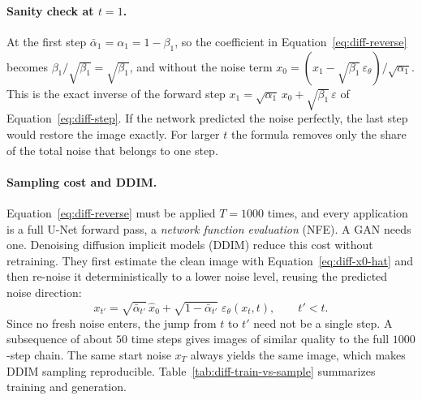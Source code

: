 \paragraph{Sanity check at $t=1$.}
At the first step $\bar\alpha_1=\alpha_1=1-\beta_1$, so the coefficient in
Equation~\ref{eq:diff-reverse} becomes
$\beta_1/\sqrt{\beta_1}=\sqrt{\beta_1}$, and without the noise term
$x_0=(x_1-\sqrt{\beta_1}\,\varepsilon_\theta)/\sqrt{\alpha_1}$. This is the
exact inverse of the forward step $x_1=\sqrt{\alpha_1}\,x_0+\sqrt{\beta_1}\,
\varepsilon$ of Equation~\ref{eq:diff-step}. If the network predicted the
noise perfectly, the last step would restore the image exactly. For larger
$t$ the formula removes only the share of the total noise that belongs to one
step.

\paragraph{Sampling cost and DDIM.}
Equation~\ref{eq:diff-reverse} must be applied $T=1000$ times, and every
application is a full U-Net forward pass, a \emph{network function
evaluation} (NFE). A GAN needs one. Denoising diffusion implicit models
(DDIM) reduce this cost without retraining. They first estimate the clean
image with Equation~\ref{eq:diff-x0-hat} and then re-noise it
deterministically to a lower noise level, reusing the predicted noise
direction:
\begin{equation}
  x_{t'} = \sqrt{\bar\alpha_{t'}}\,\hat x_0
  + \sqrt{1-\bar\alpha_{t'}}\;\varepsilon_\theta(x_t,t),
  \qquad t'<t.
  \label{eq:diff-ddim}
\end{equation}
\noindent
Since no fresh noise enters, the jump from $t$ to $t'$ need not be a single
step. A subsequence of about $50$ time steps gives images of similar quality
to the full $1000$-step chain. The same start noise $x_T$ always yields the
same image, which makes DDIM sampling reproducible.
Table~\ref{tab:diff-train-vs-sample} summarizes training and generation.

